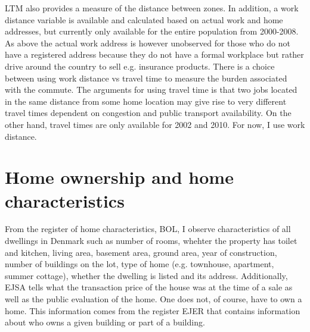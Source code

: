 LTM also provides a measure of the distance between zones. In addition, a work distance variable is available and calculated based on actual work and home addresses, but currently only available for the entire population from 2000-2008. As above the actual work address is however unobserved for those who do not have a registered address because they do not have a formal workplace but rather drive around the country to sell e.g. insurance products. There is a choice between using work distance vs travel time to measure the burden associated with the commute. The arguments for using travel time is that two jobs located in the same distance from some home location may give rise to very different travel times dependent on congestion and public transport availability. On the other hand, travel times are only available for 2002 and 2010. For now, I use work distance.  %

\section{Home ownership and home characteristics}
From the register of home characteristics, BOL, I observe characteristics of all dwellings in Denmark such as number of rooms, whehter the property has toilet and kitchen, living area, basement area, ground area, year of construction, number of buildings on the lot, type of home (e.g. townhouse, apartment, summer cottage), whether the dwelling is listed and its address. Additionally, EJSA tells what the transaction price of the house was at the time of a sale as well as the public evaluation of the home. One does not, of course, have to own a home. This information comes from the register EJER that contains information about who owns a given building or part of a building. 

